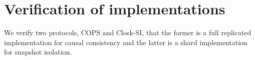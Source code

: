 \section{Verification of implementations}

We verify two protocols, COPS and Closk-SI, that the former is a full replicated implementation for causal consistency and the latter is a shard implementation for snapshot isolation.




